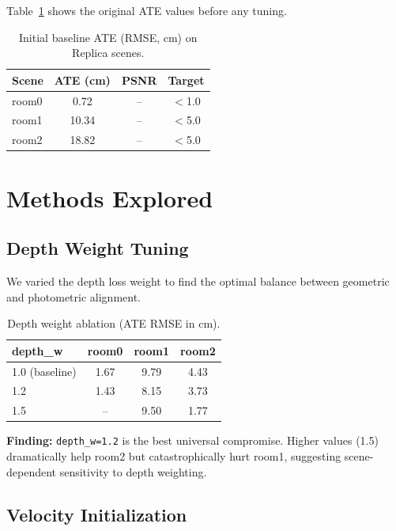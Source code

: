 \documentclass[10pt,twocolumn]{article}
\begin{document}
Table~\ref{tab:initial} shows the original ATE values before any tuning.

\begin{table}[h]
\centering
\caption{Initial baseline ATE (RMSE, cm) on Replica scenes.}
\label{tab:initial}
\begin{tabular}{lccc}
\toprule
\textbf{Scene} & \textbf{ATE (cm)} & \textbf{PSNR} & \textbf{Target} \\
\midrule
room0 & 0.72 & -- & $<$1.0 \\
room1 & 10.34 & -- & $<$5.0 \\
room2 & 18.82 & -- & $<$5.0 \\
\bottomrule
\end{tabular}
\end{table}

\section{Methods Explored}

\subsection{Depth Weight Tuning}

We varied the depth loss weight to find the optimal balance between geometric and photometric alignment.

\begin{table}[h]
\centering
\caption{Depth weight ablation (ATE RMSE in cm).}
\label{tab:depth_weight}
\begin{tabular}{lccc}
\toprule
\textbf{depth\_w} & \textbf{room0} & \textbf{room1} & \textbf{room2} \\
\midrule
1.0 (baseline) & 1.67 & 9.79 & 4.43 \\
1.2 & 1.43 & 8.15 & 3.73 \\
1.5 & -- & 9.50 & 1.77 \\
\bottomrule
\end{tabular}
\end{table}

\textbf{Finding:} \texttt{depth\_w=1.2} is the best universal compromise. Higher values (1.5) dramatically help room2 but catastrophically hurt room1, suggesting scene-dependent sensitivity to depth weighting.

\subsection{Velocity Initialization}
\end{document}
